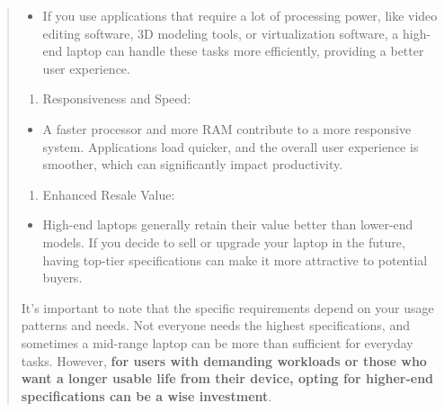 \begin{leftbar}
\begin{quote}
\begin{itemize}
\item
If you use applications that require a lot of processing power, like video editing software, 3D modeling tools, or virtualization software, a high-end laptop can handle these tasks more efficiently, providing a better user experience.
\end{itemize}

\begin{enumerate}[leftmargin=*]
\def\labelenumi{\arabic{enumi}.}
\setcounter{enumi}{6}

\item
Responsiveness and Speed:
\end{enumerate}

\begin{itemize}

\item
A faster processor and more RAM contribute to a more responsive system. Applications load quicker, and the overall user experience is smoother, which can significantly impact productivity.
\end{itemize}

\begin{enumerate}[leftmargin=*]
\def\labelenumi{\arabic{enumi}.}
\setcounter{enumi}{7}

\item
Enhanced Resale Value:
\end{enumerate}

\begin{itemize}

\item
High-end laptops generally retain their value better than lower-end models. If you decide to sell or upgrade your laptop in the future, having top-tier specifications can make it more attractive to potential buyers.
\end{itemize}

It's important to note that the specific requirements depend on your usage patterns and needs. Not everyone needs the highest specifications, and sometimes a mid-range laptop can be more than sufficient for everyday tasks. However, \textbf{for users with demanding workloads or those who want a longer usable life from their device, opting for higher-end specifications can be a wise investment}.
\end{quote}\end{leftbar}

